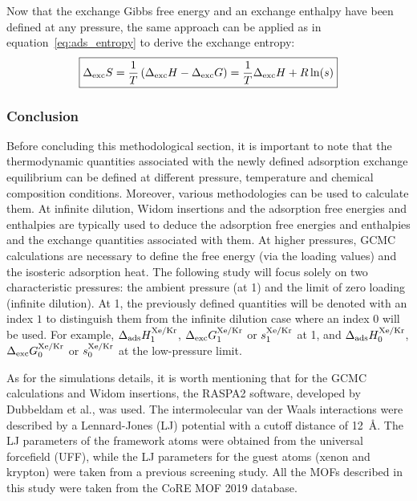 \documentclass[main.tex]{subfiles}
\begin{document}
Now that the exchange Gibbs free energy and an exchange enthalpy have been defined at any pressure, the same approach can be applied as in equation~\ref{eq:ads_entropy} to derive the exchange entropy:
\begin{equation}\label{eq:exc_entropy}
  \boxed{
  \Delta_{\text{exc}}S = \dfrac{1}{T}\left(\Delta_{\text{exc}}H - \Delta_{\text{exc}}G\right)= \dfrac{1}{T}\Delta_{\text{exc}}H + R\ln(s)
  }
\end{equation}

\subsubsection{Conclusion}

Before concluding this methodological section, it is important to note that the thermodynamic quantities associated with the newly defined adsorption exchange equilibrium can be defined at different pressure, temperature and chemical composition conditions. Moreover, various methodologies can be used to calculate them. At infinite dilution, Widom insertions and the adsorption free energies and enthalpies are typically used to deduce the adsorption free energies and enthalpies and the exchange quantities associated with them. At higher pressures, GCMC calculations are necessary to define the free energy (via the loading values) and the isosteric adsorption heat. The following study will focus solely on two characteristic pressures: the ambient pressure (at \SI{1}{\atm}) and the limit of zero loading (infinite dilution). At \SI{1}{\atm}, the previously defined quantities will be denoted with an index $1$ to distinguish them from the infinite dilution case where an index $0$ will be used. For example, $\Delta_{\text{ads}}H_{\text{1}}^{\text{Xe/Kr}}$, $\Delta_{\text{exc}}G_{\text{1}}^{\text{Xe/Kr}}$ or $s_{\text{1}}^{\text{Xe/Kr}}$ at \SI{1}{\atm}, and $\Delta_{\text{ads}}H_{\text{0}}^{\text{Xe/Kr}}$, $\Delta_{\text{exc}}G_{\text{0}}^{\text{Xe/Kr}}$ or $s_{\text{0}}^{\text{Xe/Kr}}$ at the low-pressure limit. 

As for the simulations details, it is worth mentioning that for the GCMC calculations and Widom insertions, the RASPA2 software, developed by Dubbeldam et al.\autocite{dubbeldam2016}, was used. The intermolecular van der Waals interactions were described by a Lennard-Jones (LJ) potential with a cutoff distance of \SI{12}{\angstrom}. The LJ parameters of the framework atoms were obtained from the universal forcefield (UFF),\autocite{rappe1992} while the LJ parameters for the guest atoms (xenon and krypton) were taken from a previous screening study.\autocite{Ryan_2010} All the MOFs described in this study were taken from the CoRE MOF 2019 database.\autocite{Chung_2019}
\end{document}
